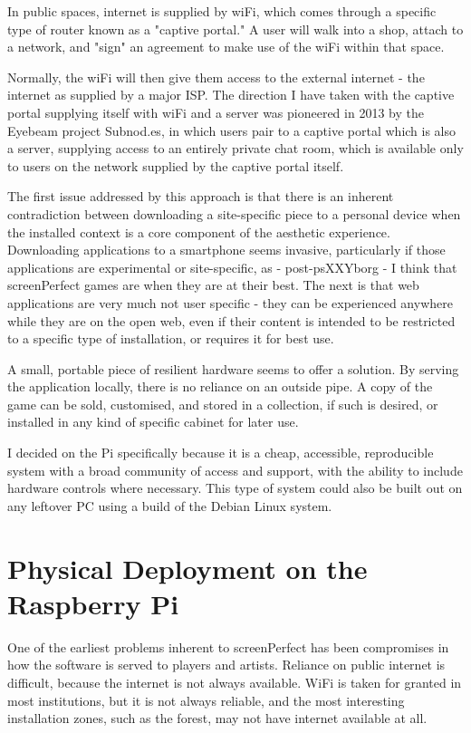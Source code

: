 In public spaces, internet is supplied by wiFi, which comes through a specific type of router known as a "captive portal." A user will walk into a shop, attach to a network, and "sign" an agreement to make use of the wiFi within that space. 

Normally, the wiFi will then give them access to the external internet - the internet as supplied by a major ISP. The direction I have taken with the captive portal supplying itself with wiFi and a server was pioneered in 2013 by the Eyebeam project Subnod.es, in which users pair to a captive portal which is also a server, supplying access to an entirely private chat room, which is available only to users on the network supplied by the captive portal itself. 

The first issue addressed by this approach is that there is an inherent contradiction between downloading a site-specific piece to a personal device when the installed context is a core component of the aesthetic experience. Downloading applications to a smartphone seems invasive, particularly if those applications are experimental or site-specific, as - post-psXXYborg - I think that screenPerfect games are when they are at their best. The next is that web applications are very much not user specific - they can be experienced anywhere while they are on the open web, even if their content is intended to be restricted to a specific type of installation, or requires it for best use. 

A small, portable piece of resilient hardware seems to offer a solution. By serving the application locally, there is no reliance on an outside pipe. A copy of the game can be sold, customised, and stored in a collection, if such is desired, or installed in any kind of specific cabinet for later use. 

I decided on the Pi specifically because it is a cheap, accessible, reproducible system with a broad community of access and support, with the ability to include hardware controls where necessary. This type of system could also be built out on any leftover PC using a build of the Debian Linux system.

\section{Physical Deployment on the Raspberry Pi}
One of the earliest problems inherent to screenPerfect has been compromises in how the software is served to players and artists. Reliance on public internet is difficult, because the internet is not always available. WiFi is taken for granted in most institutions, but it is not always reliable, and the most interesting installation zones, such as the forest, may not have internet available at all. 

